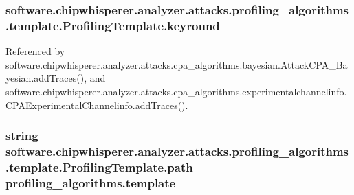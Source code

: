 \subsubsection[{keyround}]{\setlength{\rightskip}{0pt plus 5cm}software.\+chipwhisperer.\+analyzer.\+attacks.\+profiling\+\_\+algorithms.\+template.\+Profiling\+Template.\+keyround}\label{classsoftware_1_1chipwhisperer_1_1analyzer_1_1attacks_1_1profiling__algorithms_1_1template_1_1ProfilingTemplate_a3ae2ff09ae6a7134dedd457bda82f98a}


Referenced by software.\+chipwhisperer.\+analyzer.\+attacks.\+cpa\+\_\+algorithms.\+bayesian.\+Attack\+C\+P\+A\+\_\+\+Bayesian.\+add\+Traces(), and software.\+chipwhisperer.\+analyzer.\+attacks.\+cpa\+\_\+algorithms.\+experimentalchannelinfo.\+C\+P\+A\+Experimental\+Channelinfo.\+add\+Traces().

\hypertarget{classsoftware_1_1chipwhisperer_1_1analyzer_1_1attacks_1_1profiling__algorithms_1_1template_1_1ProfilingTemplate_abb2bc4c23ef1dbb79b1c899863409ef4}{}
\subsubsection[{path}]{\setlength{\rightskip}{0pt plus 5cm}string software.\+chipwhisperer.\+analyzer.\+attacks.\+profiling\+\_\+algorithms.\+template.\+Profiling\+Template.\+path = \textquotesingle{}profiling\+\_\+algorithms.\+template\textquotesingle{}\hspace{0.3cm}{\ttfamily [static]}}\label{classsoftware_1_1chipwhisperer_1_1analyzer_1_1attacks_1_1profiling__algorithms_1_1template_1_1ProfilingTemplate_abb2bc4c23ef1dbb79b1c899863409ef4}
\hypertarget{classsoftware_1_1chipwhisperer_1_1analyzer_1_1attacks_1_1profiling__algorithms_1_1template_1_1ProfilingTemplate_a55db6d81473c29a771ba813ebdbde517}{}
